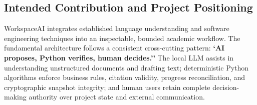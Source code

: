 \subsection*{Intended Contribution and Project Positioning}

WorkspaceAI integrates established language understanding and software engineering techniques into an inspectable, bounded academic workflow. The fundamental architecture follows a consistent cross-cutting pattern: \textbf{`AI proposes, Python verifies, human decides.''} 
The local LLM assists in understanding unstructured documents and drafting text; deterministic Python algorithms enforce business rules, citation validity, progress reconciliation, and cryptographic snapshot integrity; and human users retain complete decision-making authority over project state and external communication.

